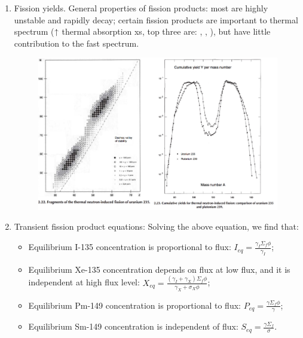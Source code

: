 \documentclass{school-22.211-notes}
\begin{document}
\begin{enumerate}
\item Fission yields. General properties of fission products: most are highly unstable and rapidly decay; certain fission products are important to thermal spectrum ($\uparrow$ thermal absorption xs, top three are: , , ), but have little contribution to the fast spectrum. 
\begin{figure}[ht]
  \centering
  \includegraphics[width=5in]{images/dfs/fission-product-yield.png}
\end{figure}

\item Transient fission product equations: 
 Solving the above equation, we find that: 
 \begin{itemize}
   \item Equilibrium I-135 concentration is proportional to flux: $I_{eq} = \frac{\gamma_I \Sigma_f \phi}{\gamma_I}$;
   \item Equilibrium Xe-135 concentration depends on flux at low flux, and it is independent at high flux level: $X_{eq} = \frac{(\gamma_I + \gamma_X) \Sigma_f \phi}{\gamma_X + \sigma_X \phi}$;
   \item Equilibrium Pm-149 concentration is proportional to flux: $P_{eq} = \frac{\gamma \Sigma_f \phi}{\gamma}$;
   \item Equilibrium Sm-149 concentration is independent of flux: $S_{eq} = \frac{\gamma \Sigma_f}{\sigma}$. 
 \end{itemize}


\end{enumerate}
\end{document}
